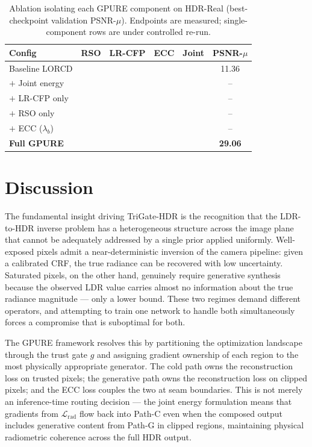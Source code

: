 \documentclass[10pt,twocolumn,letterpaper]{article}
\newcommand{\cmark}{\ding{51}}
\newcommand{\xmark}{\ding{55}}
\newcommand{\Lrad}{\mathcal{L}_{\mathrm{rad}}}
\begin{document}
\begin{table}[t]
\centering
\small
\caption{Ablation isolating each GPURE component on HDR-Real (best-checkpoint validation PSNR-$\mu$). Endpoints are measured; single-component rows are under controlled re-run.}
\label{tab:ablation}
\begin{tabular}{lccccc}
\toprule
Config & RSO & LR-CFP & ECC & Joint & PSNR-$\mu$ \\
\midrule
Baseline LORCD & \xmark & \xmark & \xmark & \xmark & 11.36 \\
$+$ Joint energy & \xmark & \xmark & \xmark & \cmark & -- \\
$+$ LR-CFP only & \xmark & \cmark & \xmark & \cmark & -- \\
$+$ RSO only & \cmark & \xmark & \xmark & \cmark & -- \\
$+$ ECC ($\lambda_b$) & \xmark & \xmark & \cmark & \cmark & -- \\
\textbf{Full GPURE} & \cmark & \cmark & \cmark & \cmark & \textbf{29.06} \\
\bottomrule
\end{tabular}
\end{table}

\section{Discussion}
\label{sec:discussion}

The fundamental insight driving TriGate-HDR is the recognition that the LDR-to-HDR inverse problem has a heterogeneous structure across the image plane that cannot be adequately addressed by a single prior applied uniformly. Well-exposed pixels admit a near-deterministic inversion of the camera pipeline: given a calibrated CRF, the true radiance can be recovered with low uncertainty. Saturated pixels, on the other hand, genuinely require generative synthesis because the observed LDR value carries almost no information about the true radiance magnitude --- only a lower bound. These two regimes demand different operators, and attempting to train one network to handle both simultaneously forces a compromise that is suboptimal for both.

The GPURE framework resolves this by partitioning the optimization landscape through the trust gate $g$ and assigning gradient ownership of each region to the most physically appropriate generator. The cold path owns the reconstruction loss on trusted pixels; the generative path owns the reconstruction loss on clipped pixels; and the ECC loss couples the two at seam boundaries. This is not merely an inference-time routing decision --- the joint energy formulation means that gradients from $\Lrad$ flow back into Path-C even when the composed output includes generative content from Path-G in clipped regions, maintaining physical radiometric coherence across the full HDR output.
\end{document}
